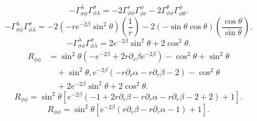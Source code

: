 \documentclass[11pt, a4paper]{report}
\begin{document}
\begin{equation}
-\Gamma^\lambda_{\sigma\phi} \Gamma^\sigma_{\phi\lambda} = -2\Gamma^r_{\phi\phi} \Gamma^\phi_{\phi r} - 2\Gamma^\theta_{\phi\phi} \Gamma^\phi_{\phi\theta}.
\end{equation}
\begin{equation}
-\Gamma^\lambda_{\sigma\phi} \Gamma^\sigma_{\phi\lambda} = -2\left( -re^{-2\beta}\sin^2\theta \right)\left(\frac{1}{r}\right) - 2\left(-\sin\theta\cos\theta\right)\left(\frac{\cos\theta}{\sin\theta}\right).
\end{equation}
\begin{equation}
-\Gamma^\lambda_{\sigma\phi} \Gamma^\sigma_{\phi\lambda} = 2e^{-2\beta}\sin^2\theta + 2\cos^2\theta.
\end{equation}
\begin{align}
R_{\phi\phi} &= \sin^2\theta \left( -e^{-2\beta} + 2r\partial_r\beta e^{-2\beta} \right) - \cos^2\theta + \sin^2\theta \nonumber \\
&\quad + \sin^2\theta , e^{-2\beta} \left( -r\partial_r\alpha - r\partial_r\beta - 2 \right) - \cos^2\theta \nonumber \\
&\quad + 2e^{-2\beta}\sin^2\theta + 2\cos^2\theta.
\end{align}
\begin{equation}
R_{\phi\phi} = \sin^2\theta \left[ e^{-2\beta} \left( -1 + 2r\partial_r\beta - r\partial_r\alpha - r\partial_r\beta - 2 + 2 \right) + 1 \right].
\end{equation}
\begin{equation}
R_{\phi\phi} = \sin^2\theta \left[ e^{-2\beta} \left( r\partial_r\beta - r\partial_r\alpha - 1 \right) + 1 \right].
\end{equation}
\end{document}
